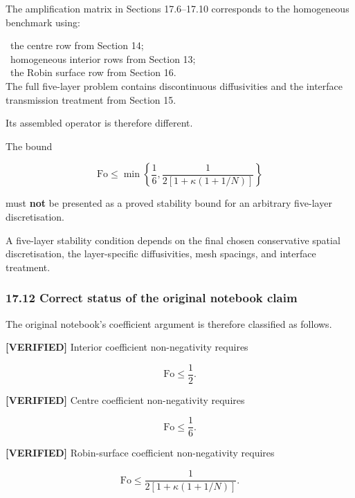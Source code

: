 \documentclass[11pt,a4paper]{article}
\begin{document}
The amplification matrix in Sections 17.6–17.10 corresponds to the homogeneous benchmark using:

\noindent\textbullet\ the centre row from Section 14;\\
\noindent\textbullet\ homogeneous interior rows from Section 13;\\
\noindent\textbullet\ the Robin surface row from Section 16.\\

The full five-layer problem contains discontinuous diffusivities and the interface transmission treatment from Section 15.

Its assembled operator is therefore different.

The bound

\begin{equation}
\mathrm{Fo}
\le
\min
\left\{
\frac16,
\frac1{
2[1+\kappa(1+1/N)]
}
\right\}
\tag{TRISO-DIS-577}
\label{eq:triso-dis-577}
\end{equation}

must \textbf{not} be presented as a proved stability bound for an arbitrary five-layer discretisation.

A five-layer stability condition depends on the final chosen conservative spatial discretisation, the layer-specific diffusivities, mesh spacings, and interface treatment.

\subsubsection*{17.12 Correct status of the original notebook claim}

The original notebook's coefficient argument is therefore classified as follows.

\textbf{[VERIFIED]} Interior coefficient non-negativity requires

\begin{equation}
\mathrm{Fo}\le\frac12.
\tag{TRISO-DIS-578}
\label{eq:triso-dis-578}
\end{equation}

\textbf{[VERIFIED]} Centre coefficient non-negativity requires

\begin{equation}
\mathrm{Fo}\le\frac16.
\tag{TRISO-DIS-579}
\label{eq:triso-dis-579}
\end{equation}

\textbf{[VERIFIED]} Robin-surface coefficient non-negativity requires

\begin{equation}
\mathrm{Fo}
\le
\frac1{
2[1+\kappa(1+1/N)]
}.
\tag{TRISO-DIS-580}
\label{eq:triso-dis-580}
\end{equation}
\end{document}
